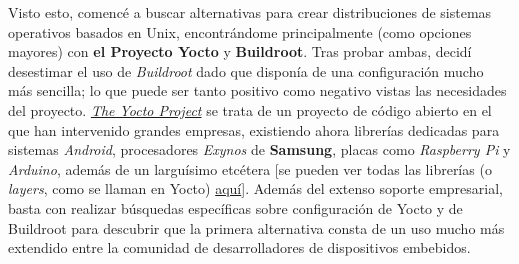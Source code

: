 \documentclass[13pt]{scrartcl}
\begin{document}
				Visto esto, comencé a buscar alternativas para crear distribuciones de sistemas operativos basados en Unix, encontrándome principalmente (como opciones mayores) con \textbf{el Proyecto Yocto} y \textbf{Buildroot}. Tras probar ambas, decidí desestimar el uso de \textit{Buildroot} dado que disponía de una configuración mucho más sencilla; lo que puede ser tanto positivo como negativo vistas las necesidades del proyecto. \href{https://www.yoctoproject.org/}{\textit{The Yocto Project}} se trata de un proyecto de código abierto en el que han intervenido grandes empresas, existiendo ahora librerías dedicadas para sistemas \textit{Android}, procesadores \textit{Exynos} de \textbf{Samsung}, placas como \textit{Raspberry Pi} y \textit{Arduino}, además de un larguísimo etcétera [se pueden ver todas las librerías (o \textit{layers}, como se llaman en Yocto) \href{layers.openembedded.org}{aquí}]. Además del extenso soporte empresarial, basta con realizar búsquedas específicas sobre configuración de Yocto y de Buildroot para descubrir que la primera alternativa consta de un uso mucho más extendido entre la comunidad de desarrolladores de dispositivos embebidos.\\
				
\end{document}
